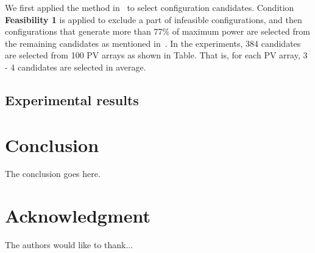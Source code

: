 \documentclass[journal]{IEEEtran}
\begin{document}
We first applied the method in~\cite{Orozco-Gutierrez2016} to select configuration candidates.
Condition \textbf{Feasibility 1} is applied to exclude a part of infeasible configurations, and then configurations that generate more than 77\% of maximum power are selected from the remaining candidates as mentioned in~\cite{Orozco-Gutierrez2016}.
In the experiments, 384 candidates are selected from 100 PV arrays as shown in Table.
That is, for each PV array, 3 - 4 candidates are selected in average.
\subsection{Experimental results}\label{sec:experimental-results}
\section{Conclusion}\label{sec:conclusion}
The conclusion goes here.



\appendices
\section*{Acknowledgment}


The authors would like to thank...






\end{document}
